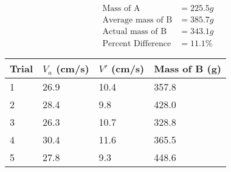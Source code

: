 \begin{equation*}
    \begin{aligned}
        \text{Mass of A}&=225.5g \\
        \text{Average mass of B}&=385.7g \\
        \text{Actual mass of B}&=343.1g \\
        \text{Percent Difference}&=11.1\%
    \end{aligned}    
\end{equation*}
\begin{table}[H]
    \begin{tabular}{|l|l|l|l|}
    \hline
    Trial & $V_a$ (cm/s) & $V'$ (cm/s) & Mass of B (g) \\ \hline
    1     & 26.9        & 10.4      & 357.8         \\ \hline
    2     & 28.4        & 9.8       & 428.0         \\ \hline
    3     & 26.3        & 10.7      & 328.8         \\ \hline
    4     & 30.4        & 11.6      & 365.5         \\ \hline
    5     & 27.8        & 9.3       & 448.6         \\ \hline
    \end{tabular}
    \end{table}
    
